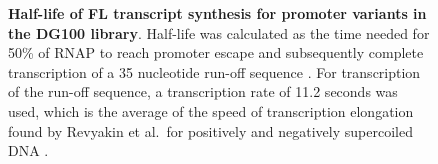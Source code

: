 \documentclass{bmcart}
\begin{document}
\begin{backmatter}
\begin{figure}[h!]
    \begin{center}
    \end{center}
    \caption{ {\bf Half-life of FL transcript synthesis for promoter variants
        in the DG100 library}. Half-life was calculated as the time needed for
        50\% of RNAP to reach promoter escape and subsequently complete
        transcription of a 35 nucleotide run-off sequence
        \cite{vo_vitro_2003-1}. For transcription of the run-off sequence, a
        transcription rate of 11.2 seconds was used, which is the average of
        the speed of transcription elongation found by Revyakin et al.\ for
        positively and negatively supercoiled DNA
        \cite{revyakin_abortive_2006}.}
    \label{fig:dg100_halflives}
\end{figure}

\end{backmatter}
\end{document}
